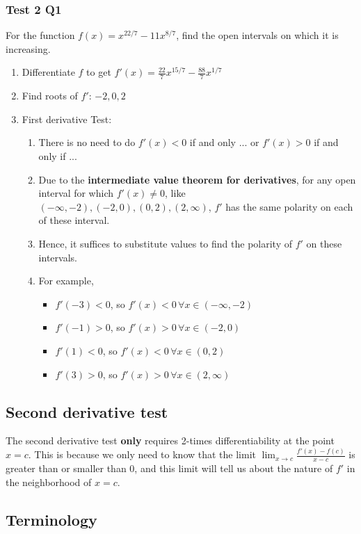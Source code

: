 \documentclass{article}
\begin{document}
\subsubsection{Test 2 Q1}
For the function $f(x)=x^{22/7}-11x^{8/7}$,
find the open intervals on which it is increasing.

\begin{enumerate}
	\item Differentiate $f$ to get $f'(x)=\frac{22}{7}x^{15/7}-\frac{88}{7}x^{1/7}$
	\item Find roots of $f'$: $-2, 0, 2$
	\item First derivative Test:
	\begin{enumerate}
		\item There is no need to do $f'(x)<0$ if and only ... or $f'(x)>0$ if and only if ...
		\item Due to the \textbf{intermediate value theorem for derivatives}, for any open interval for which $f'(x)\neq 0$, like $(-\infty, -2), (-2, 0), (0, 2), (2, \infty)$, $f'$ has the same polarity on each of these interval.
		\item Hence, it suffices to substitute values to find the polarity of $f'$ on these intervals.
		\item For example,
		\begin{itemize}
			\item $f'(-3) < 0$, so $f'(x)<0\, \forall x\in(-\infty, -2)$
			\item $f'(-1) > 0$, so $f'(x)>0\, \forall x\in(-2, 0)$
			\item $f'(1) < 0$, so $f'(x)<0\, \forall x\in(0, 2)$
			\item $f'(3) > 0$, so $f'(x)>0\, \forall x\in(2, \infty)$
		\end{itemize}
	\end{enumerate}
\end{enumerate}


\subsection{Second derivative test}
The second derivative test \textbf{only} requires 2-times differentiability at the point $x=c$. This is because we only need to know that the limit $\lim_{x\rightarrow c}\frac{f'(x)-f(c)}{x-c}$ is greater than or smaller than 0, and this limit will tell us about the nature of $f'$ in the neighborhood of $x=c$. 

\subsection{Terminology}
\end{document}
